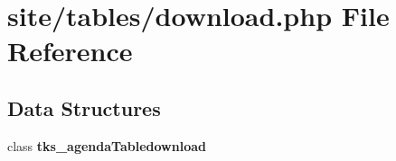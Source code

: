 \section{site/tables/download.php File Reference}
\label{site_2tables_2download_8php}
\subsection*{Data Structures}
\begin{DoxyCompactItemize}
\item 
class \textbf{ tks\+\_\+agenda\+Tabledownload}
\end{DoxyCompactItemize}
